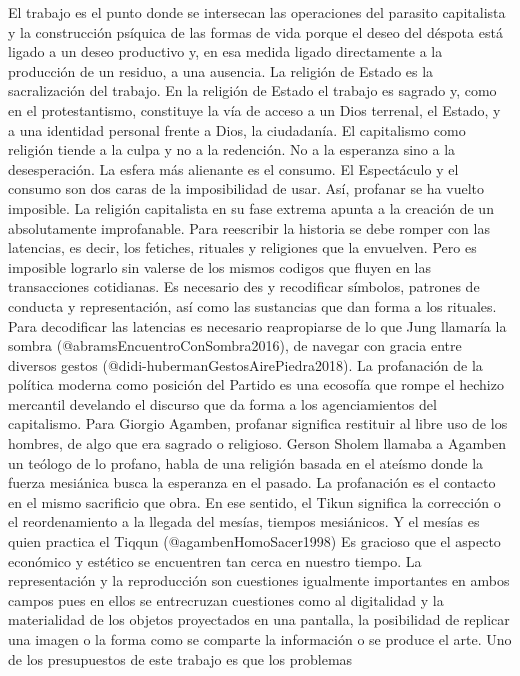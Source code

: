 \documentclass[
]{article}
\begin{document}
El trabajo es el punto donde se intersecan las operaciones del parasito
capitalista y la construcción psíquica de las formas de vida porque el
deseo del déspota está ligado a un deseo productivo y, en esa medida
ligado directamente a la producción de un residuo, a una ausencia. La
religión de Estado es la sacralización del trabajo. En la religión de
Estado el trabajo es sagrado y, como en el protestantismo, constituye la
vía de acceso a un Dios terrenal, el Estado, y a una identidad personal
frente a Dios, la ciudadanía. El capitalismo como religión tiende a la
culpa y no a la redención. No a la esperanza sino a la desesperación. La
esfera más alienante es el consumo. El Espectáculo y el consumo son dos
caras de la imposibilidad de usar. Así, profanar se ha vuelto imposible.
La religión capitalista en su fase extrema apunta a la creación de un
absolutamente improfanable. Para reescribir la historia se debe romper
con las latencias, es decir, los fetiches, rituales y religiones que la
envuelven. Pero es imposible lograrlo sin valerse de los mismos codigos
que fluyen en las transacciones cotidianas. Es necesario des y
recodificar símbolos, patrones de conducta y representación, así como
las sustancias que dan forma a los rituales. Para decodificar las
latencias es necesario reapropiarse de lo que Jung llamaría la sombra
(@abramsEncuentroConSombra2016), de navegar con gracia entre diversos
gestos (@didi-hubermanGestosAirePiedra2018). La profanación de la
política moderna como posición del Partido es una ecosofía que rompe el
hechizo mercantil develando el discurso que da forma a los
agenciamientos del capitalismo. Para Giorgio Agamben, profanar significa
restituir al libre uso de los hombres, de algo que era sagrado o
religioso. Gerson Sholem llamaba a Agamben un teólogo de lo profano,
habla de una religión basada en el ateísmo donde la fuerza mesiánica
busca la esperanza en el pasado. La profanación es el contacto en el
mismo sacrificio que obra. En ese sentido, el Tikun significa la
corrección o el reordenamiento a la llegada del mesías, tiempos
mesiánicos. Y el mesías es quien practica el Tiqqun
(@agambenHomoSacer1998) Es gracioso que el aspecto económico y estético
se encuentren tan cerca en nuestro tiempo. La representación y la
reproducción son cuestiones igualmente importantes en ambos campos pues
en ellos se entrecruzan cuestiones como al digitalidad y la materialidad
de los objetos proyectados en una pantalla, la posibilidad de replicar
una imagen o la forma como se comparte la información o se produce el
arte. Uno de los presupuestos de este trabajo es que los problemas
\end{document}
